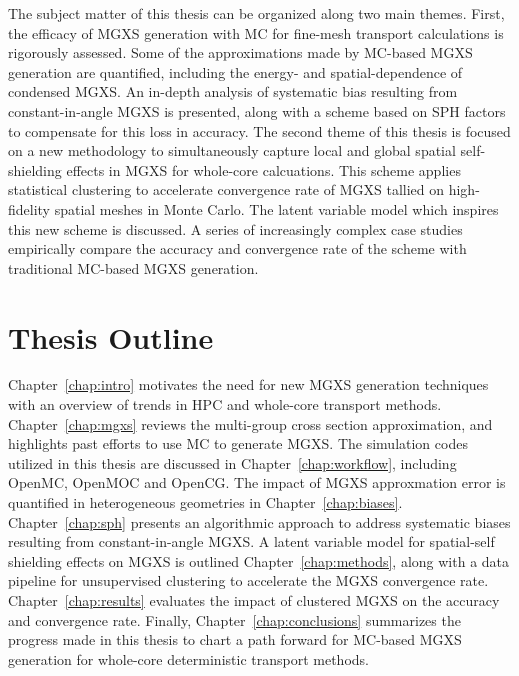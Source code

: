 The subject matter of this thesis can be organized along two main themes. First, the efficacy of \ac{MGXS} generation with \ac{MC} for fine-mesh transport calculations is rigorously assessed. Some of the approximations made by \ac{MC}-based \ac{MGXS} generation are quantified, including the energy- and spatial-dependence of condensed \ac{MGXS}. An in-depth analysis of systematic bias resulting from constant-in-angle \ac{MGXS} is presented, along with a scheme based on \ac{SPH} factors to compensate for this loss in accuracy. The second theme of this thesis is focused on a new methodology to simultaneously capture local and global spatial self-shielding effects in \ac{MGXS} for whole-core calcuations. This scheme applies statistical clustering to accelerate convergence rate of \ac{MGXS} tallied on high-fidelity spatial meshes in Monte Carlo. The latent variable model which inspires this new scheme is discussed. A series of increasingly complex case studies empirically compare the accuracy and convergence rate of the scheme with traditional \ac{MC}-based MGXS generation.


\section{Thesis Outline}
\label{sec:chap1-outline}

Chapter~\ref{chap:intro} motivates the need for new \ac{MGXS} generation techniques with an overview of trends in \ac{HPC} and whole-core transport methods. Chapter~\ref{chap:mgxs} reviews the multi-group cross section approximation, and highlights past efforts to use \ac{MC} to generate \ac{MGXS}. The simulation codes utilized in this thesis are discussed in Chapter~\ref{chap:workflow}, including OpenMC, OpenMOC and OpenCG. The impact of \ac{MGXS} approxmation error is quantified in heterogeneous geometries in Chapter~\ref{chap:biases}. Chapter~\ref{chap:sph} presents an algorithmic approach to address systematic biases resulting from constant-in-angle \ac{MGXS}. A latent variable model for spatial-self shielding effects on \ac{MGXS} is outlined Chapter~\ref{chap:methods}, along with a data pipeline for unsupervised clustering to accelerate the \ac{MGXS} convergence rate. Chapter~\ref{chap:results} evaluates the impact of clustered \ac{MGXS} on the accuracy and convergence rate. Finally, Chapter~\ref{chap:conclusions} summarizes the progress made in this thesis to chart a path forward for \ac{MC}-based \ac{MGXS} generation for whole-core deterministic transport methods.

